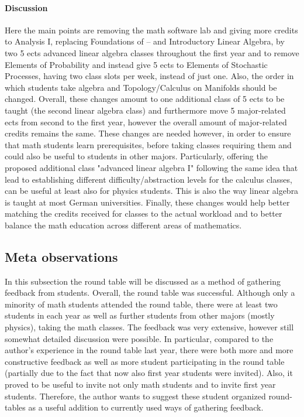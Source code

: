 \paragraph{Discussion}
Here the main points are removing the math software lab and giving more credits to Analysis I, replacing Foundations of -- and Introductory Linear Algebra, by two 5 ects advanced linear algebra classes throughout the first year and to remove Elements of Probability and instead give 5 ects to Elements of Stochastic Processes, having two class slots per week, instead of just one.  
Also, the order in which students take algebra and Topology/Calculus on Manifolds should be changed.
Overall, these changes amount to one additional class of 5 ects to be taught (the second linear algebra class) and
furthermore move 5 major-related ects from second to the first year, however the overall amount of major-related credits remains the same. 
These changes are needed however, in order to ensure that math students learn prerequisites, before taking classes requiring them and could also be useful to students in other majors. 
Particularly, offering the proposed additional class "advanced linear algebra I" following the same idea that lead to establishing different difficulty/abstraction levels for the calculus classes, can be useful at least also for physics students.
This is also the way linear algebra is taught at most German universities.
Finally, these changes would help better matching the credits received for classes to the actual workload and to better balance the math education across different areas of mathematics. 


\subsection{Meta observations}
\label{sec-1-4}
In this subsection the round table will be discussed as a method of gathering feedback from students.
Overall, the round table was successful. Although only a minority of math students attended the round table, 
there were at least two students in each year as well as further students from other majors (mostly physics), taking the math classes. 
The feedback was very extensive, however still somewhat detailed discussion were possible. 
In particular, compared to the author's experience in the round table last year, 
there were both more and more constructive feedback as well as more student participating in the round table (partially due to the fact that now also first year students were invited).
Also, it proved to be useful to invite not only math students and to invite first year students. 
Therefore, the author wants to suggest these student organized round-tables as a useful addition to currently used ways of gathering feedback.

